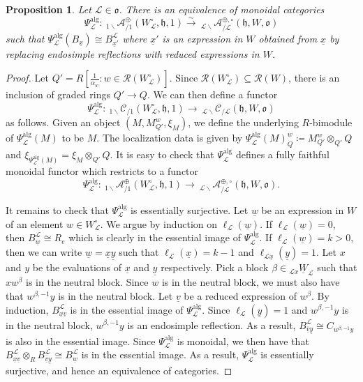 \documentclass{amsart}
\newcommand{\scrL}{\mathcal{L}}
\newcommand{\scrR}{\mathcal{R}}
\newcommand{\fr}[1]{\mathfrak{#1}}
\DeclareMathOperator{\alg}{alg}
\newcommand{\Cmon}[2]{\:_{#1 \backslash} \mathcal{C}_{/ #2} }
\newcommand{\Amon}[2]{\:_{#1 \backslash} \mathcal{A}_{/ #2} }
\newcommand{\uW}[2]{{}_{#1}\underline{W}_{#2}}
\newcommand{\uw}{\underline{w}}
\newcommand{\ux}{\underline{x}}
\newcommand{\uy}{\underline{y}}
\newtheorem{proposition}[subsubsection]{Proposition}
\theoremstyle{definition}
\numberwithin{equation}{subsection}
\begin{document}
\begin{proposition}\label{prop:abe_endo}
    Let $\scrL \in \fr{o}$. There is an equivalence of monoidal categories
    \[ \Psi_{\scrL}^{\alg} : \Amon{1}{1}^{\oplus} (W_{\scrL}^{\circ}, \fr{h}, 1) \stackrel{\sim}{\to} \Amon{\scrL}{\scrL}^{\oplus, \circ} (\fr{h}, W, \fr{o})\]
    such that $\Psi_{\scrL}^{\alg} (B_{\ux}) \cong B_{\ux'}^{\scrL}$ where $\ux'$ is an expression in $W$ obtained from $\ux$ by replacing endosimple reflections with reduced expressions in $W$.
\end{proposition}
\begin{proof}
    Let $Q' = R [\frac{1}{\alpha_w} \colon w \in \scrR (W_{\scrL}^{\circ})]$.
    Since $\scrR (W_{\scrL}^{\circ}) \subseteq \scrR (W)$, there is an inclusion of graded rings $Q' \to Q$.
    We can then define a functor
    \begin{equation}
        \Psi_{\scrL}^{\alg} : \Cmon{1}{1} (W_{\scrL}^{\circ}, \fr{h}, 1) \to \Cmon{\scrL}{\scrL} (\fr{h}, W, \fr{o})
    \end{equation}
    as follows.
    Given an object $(M, M_{Q'}^w, \xi_M)$, we define the underlying $R$-bimodule of $\Psi_{\scrL}^{\alg} (M)$ to be $M$.
    The localization data is given by $\Psi_{\scrL}^{\alg} (M)_Q^w \coloneq M_{Q'}^w \otimes_{Q'} Q$ and $\xi_{\Psi_{\scrL}^{\alg} (M)} = \xi_M \otimes_{Q'} Q$.
    It is easy to check that $\Psi_{\scrL}^{\alg}$ defines a fully faithful monoidal functor which restricts to a functor
    \begin{equation}
        \Psi_{\scrL}^{\alg} : \Amon{1}{1}^{\oplus} (W_{\scrL}^{\circ}, \fr{h}, 1) \to \Amon{\scrL}{\scrL}^{\oplus, \circ} (\fr{h}, W, \fr{o}).
    \end{equation}

    It remains to check that $\Psi_{\scrL}^{\alg}$ is essentially surjective.
    Let $\uw$ be an expression in $W$ of an element $w \in W_{\scrL}^{\circ}$.
    We argue by induction on $\ell_{\scrL} (\uw)$. If $\ell_{\scrL} (\uw) = 0$, then $B_{\uw}^{\scrL} \cong R_e$ which is clearly in the essential image of $\Psi_{\scrL}^{\alg}$.
    If $\ell_{\scrL} (\uw) = k > 0$, then we can write $\uw = \ux \uy$ such that $\ell_{\scrL} (\ux) = k-1$ and $\ell_{\scrL \ux} (\uy) = 1$. Let $x$ and $y$ be the evaluations of $\ux$ and $\uy$ respectively.
    Pick a block $\beta \in \uW{\scrL x}{\scrL}$ such that $x w^{\beta}$ is in the neutral block. 
    Since $w$ is in the neutral block, we must also have that $w^{\beta, -1} y$ is in the neutral block.
    Let $\underline{v}$ be a reduced expression of $w^{\beta}$.
    By induction, $B_{\ux \underline{v}}^{\scrL}$ is in the essential image of $\Psi_{\scrL}^{\alg}$.
    Since $\ell_{\scrL} (\uy) = 1$ and $w^{\beta, -1} y$ is in the neutral block, $w^{\beta, -1} y$ is an endosimple reflection. As a result, $B_{\overline{\underline{v}} \uy}^{\scrL} \cong C_{w^{\beta, -1} y}$ is also in the essential image.
    Since $\Psi_{\scrL}^{\alg}$ is monoidal, we then have that $B_{\ux \underline{v}}^{\scrL} \otimes_R B_{\overline{\underline{v}} \uy}^{\scrL} \cong B_{\uw}^{\scrL}$ is in the essential image.
    As a result, $\Psi_{\scrL}^{\alg}$ is essentially surjective, and hence an equivalence of categories.
\end{proof}
\end{document}
